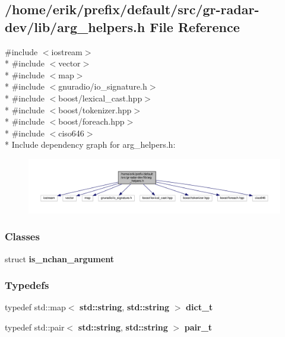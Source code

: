 \subsection{/home/erik/prefix/default/src/gr-\/radar-\/dev/lib/arg\+\_\+helpers.h File Reference}
\label{arg__helpers_8h}
{\ttfamily \#include $<$iostream$>$}\\*
{\ttfamily \#include $<$vector$>$}\\*
{\ttfamily \#include $<$map$>$}\\*
{\ttfamily \#include $<$gnuradio/io\+\_\+signature.\+h$>$}\\*
{\ttfamily \#include $<$boost/lexical\+\_\+cast.\+hpp$>$}\\*
{\ttfamily \#include $<$boost/tokenizer.\+hpp$>$}\\*
{\ttfamily \#include $<$boost/foreach.\+hpp$>$}\\*
{\ttfamily \#include $<$ciso646$>$}\\*
Include dependency graph for arg\+\_\+helpers.\+h\+:
\nopagebreak
\begin{figure}[H]
\begin{center}
\leavevmode
\includegraphics[width=350pt]{d3/da2/arg__helpers_8h__incl}
\end{center}
\end{figure}
\subsubsection*{Classes}
\begin{DoxyCompactItemize}
\item 
struct {\bf is\+\_\+nchan\+\_\+argument}
\end{DoxyCompactItemize}
\subsubsection*{Typedefs}
\begin{DoxyCompactItemize}
\item 
typedef std\+::map$<$ {\bf std\+::string}, {\bf std\+::string} $>$ {\bf dict\+\_\+t}
\item 
typedef std\+::pair$<$ {\bf std\+::string}, {\bf std\+::string} $>$ {\bf pair\+\_\+t}
\end{DoxyCompactItemize}

